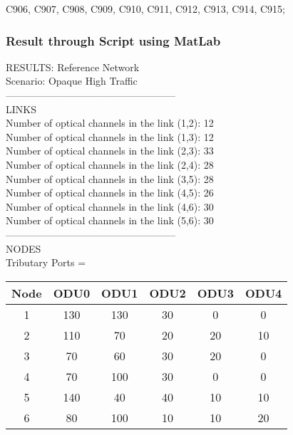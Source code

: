 C906, C907, C908, C909, C910, C911, C912, C913, C914, C915; \\


\subsubsection{Result through Script using MatLab}

\qquad RESULTS: Reference Network \\

\quad Scenario: Opaque High Traffic \\

---------------------------------------------------\\
LINKS\\

Number of optical channels in the link (1,2): 12 \\
\qquad Number of optical channels in the link (1,3): 12 \\
\qquad Number of optical channels in the link (2,3): 33 \\
\qquad Number of optical channels in the link (2,4): 28 \\
\qquad Number of optical channels in the link (3,5): 28 \\
\qquad Number of optical channels in the link (4,5): 26 \\
\qquad Number of optical channels in the link (4,6): 30 \\
\qquad Number of optical channels in the link (5,6): 30 \\


---------------------------------------------------\\
NODES\\

Tributary Ports = \\

\begin{tabular}{|c|c|c|c|c|c|}
  \hline
  Node & ODU0 & ODU1 & ODU2 & ODU3 & ODU4 \\
  \hline\hline
  1 & 130 & 130 & 30 & 0 & 0 \\
  2 & 110 & 70 & 20 & 20 & 10 \\
  3 & 70 & 60 & 30 & 20 & 0 \\
  4 & 70 & 100 & 30 & 0 & 0 \\
  5 & 140 & 40 & 40 & 10 & 10 \\
  6 & 80 & 100 & 10 & 10 & 20 \\
  \hline
\end{tabular}

